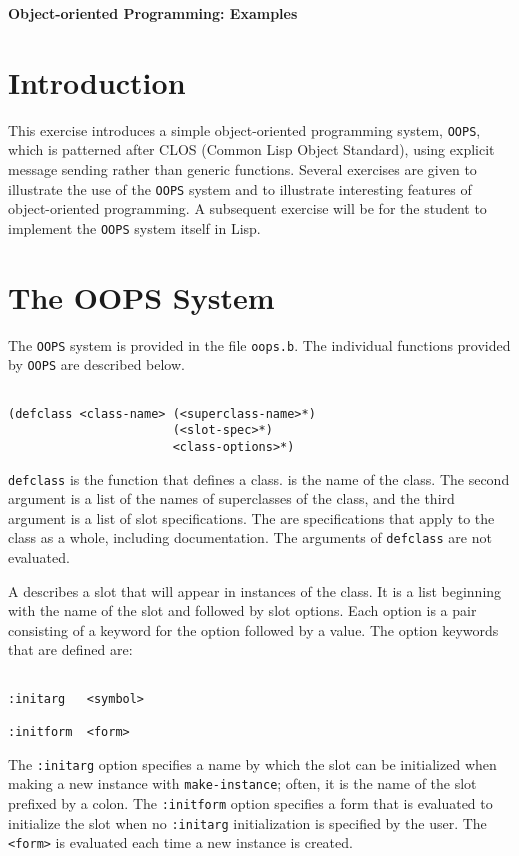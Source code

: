 \setlength{\oddsidemargin}{0 in}
\setlength{\textwidth}{6.5 in}
\setlength{\textheight}{9.0 in}
\setlength{\parskip}{0.1 in}
\setlength{\topmargin}{-0.4in}

\begin{center} {\Large {\bf Object-oriented Programming: Examples}}
\end{center}

\vspace{.15 in}

\section{Introduction}

This exercise introduces a simple object-oriented programming system,
{\tt OOPS}, which is patterned after CLOS (Common Lisp Object Standard),
using explicit message sending rather than generic functions.  Several
exercises are given to illustrate the use of the {\tt OOPS} system and
to illustrate interesting features of object-oriented programming.
A subsequent exercise will be for the student to implement the {\tt OOPS}
system itself in Lisp.

\section{The OOPS System}

The {\tt OOPS} system is provided in the file {\tt oops.b}.  The individual
functions provided by {\tt OOPS} are described below.

\begin{verbatim}

(defclass <class-name> (<superclass-name>*)
                       (<slot-spec>*)
                       <class-options>*)

\end{verbatim}
{\tt defclass} is the function that defines a class.  {\tt <class-name>} is the
name of the class.  The second argument is a list of the names of superclasses
of the class, and the third argument is a list of slot specifications.
The {\tt <class-options>} are specifications that apply to the class as a
whole, including documentation.  The arguments of {\tt defclass} are not
evaluated.

A {\tt <slot-spec>} describes a slot that will appear in instances of the
class. It is a list beginning with the name of the slot and followed by slot
options.  Each option is a pair consisting of a keyword for the option
followed by a value.  The option keywords that are defined are:
\begin{verbatim}

:initarg   <symbol>

:initform  <form>

\end{verbatim}
The {\tt :initarg} option specifies a name by which the slot can be initialized
when making a new instance with {\tt make-instance}; often, it is the name
of the slot prefixed by a colon.  The {\tt :initform} option specifies a
form that is evaluated to initialize the slot when no {\tt :initarg}
initialization is specified by the user.  The {\tt <form>} is evaluated
each time a new instance is created.

